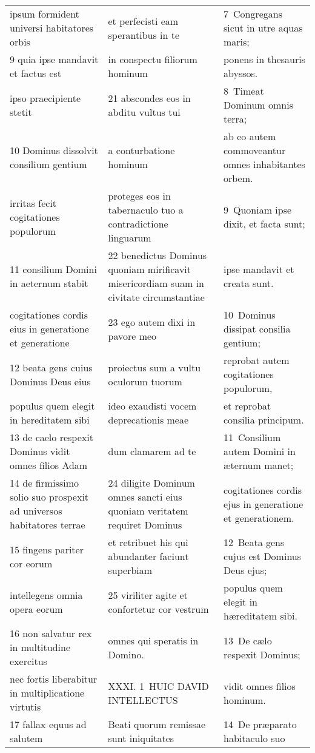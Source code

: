 \documentclass{article}
\begin{document}
\begin{longtable}{@{}p{}p{}p{}@{}}
ipsum formident universi habitatores orbis	&	et perfecisti eam sperantibus in te	&	7 Congregans sicut in utre aquas maris;	\\
9 quia ipse mandavit et factus est	&	in conspectu filiorum hominum	&	ponens in thesauris abyssos.	\\
ipso praecipiente stetit	&	21 abscondes eos in abditu vultus tui	&	8 Timeat Dominum omnis terra;	\\
10 Dominus dissolvit consilium gentium	&	a conturbatione hominum	&	ab eo autem commoveantur omnes inhabitantes orbem.	\\
irritas fecit cogitationes populorum	&	proteges eos in tabernaculo tuo a contradictione linguarum	&	9 Quoniam ipse dixit, et facta sunt;	\\
11 consilium Domini in aeternum stabit	&	22 benedictus Dominus quoniam mirificavit misericordiam suam in civitate circumstantiae	&	ipse mandavit et creata sunt.	\\
cogitationes cordis eius in generatione et generatione	&	23 ego autem dixi in pavore meo	&	10 Dominus dissipat consilia gentium;	\\
12 beata gens cuius Dominus Deus eius	&	proiectus sum a vultu oculorum tuorum	&	reprobat autem cogitationes populorum,	\\
populus quem elegit in hereditatem sibi	&	ideo exaudisti vocem deprecationis meae	&	et reprobat consilia principum.	\\
13 de caelo respexit Dominus vidit omnes filios Adam	&	dum clamarem ad te	&	11 Consilium autem Domini in æternum manet;	\\
14 de firmissimo solio suo prospexit ad universos habitatores terrae	&	24 diligite Dominum omnes sancti eius quoniam veritatem requiret Dominus	&	cogitationes cordis ejus in generatione et generationem.	\\
15 fingens pariter cor eorum	&	et retribuet his qui abundanter faciunt superbiam	&	12 Beata gens cujus est Dominus Deus ejus;	\\
intellegens omnia opera eorum	&	25 viriliter agite et confortetur cor vestrum	&	populus quem elegit in hæreditatem sibi.	\\
16 non salvatur rex in multitudine exercitus	&	omnes qui speratis in Domino.	&	13 De cælo respexit Dominus;	\\
nec fortis liberabitur in multiplicatione virtutis	&	XXXI. 1 HUIC DAVID INTELLECTUS	&	vidit omnes filios hominum.	\\
17 fallax equus ad salutem	&	Beati quorum remissae sunt iniquitates	&	14 De præparato habitaculo suo	\\

\end{longtable}
\end{document}

